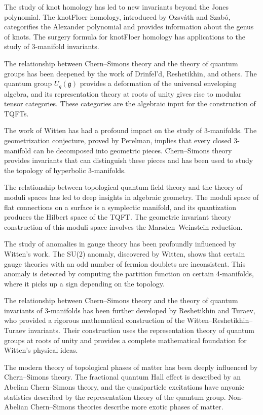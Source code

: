 The study of knot homology has led to new invariants beyond the Jones polynomial. The knotFloer homology, introduced by Ozsv\'ath and Szab\'o, categorifies the Alexander polynomial and provides information about the genus of knots. The surgery formula for knotFloer homology has applications to the study of 3-manifold invariants.

The relationship between Chern--Simons theory and the theory of quantum groups has been deepened by the work of Drinfel'd, Reshetikhin, and others. The quantum group $U_q(\mathfrak{g})$ provides a deformation of the universal enveloping algebra, and its representation theory at roots of unity gives rise to modular tensor categories. These categories are the algebraic input for the construction of TQFTs.

The work of Witten has had a profound impact on the study of 3-manifolds. The geometrization conjecture, proved by Perelman, implies that every closed 3-manifold can be decomposed into geometric pieces. Chern--Simons theory provides invariants that can distinguish these pieces and has been used to study the topology of hyperbolic 3-manifolds.

The relationship between topological quantum field theory and the theory of moduli spaces has led to deep insights in algebraic geometry. The moduli space of flat connections on a surface is a symplectic manifold, and its quantization produces the Hilbert space of the TQFT. The geometric invariant theory construction of this moduli space involves the Marsden--Weinstein reduction.

The study of anomalies in gauge theory has been profoundly influenced by Witten's work. The SU(2) anomaly, discovered by Witten, shows that certain gauge theories with an odd number of fermion doublets are inconsistent. This anomaly is detected by computing the partition function on certain 4-manifolds, where it picks up a sign depending on the topology.

The relationship between Chern--Simons theory and the theory of quantum invariants of 3-manifolds has been further developed by Reshetikhin and Turaev, who provided a rigorous mathematical construction of the Witten--Reshetikhin--Turaev invariants. Their construction uses the representation theory of quantum groups at roots of unity and provides a complete mathematical foundation for Witten's physical ideas.

The modern theory of topological phases of matter has been deeply influenced by Chern--Simons theory. The fractional quantum Hall effect is described by an Abelian Chern--Simons theory, and the quasiparticle excitations have anyonic statistics described by the representation theory of the quantum group. Non-Abelian Chern--Simons theories describe more exotic phases of matter.


